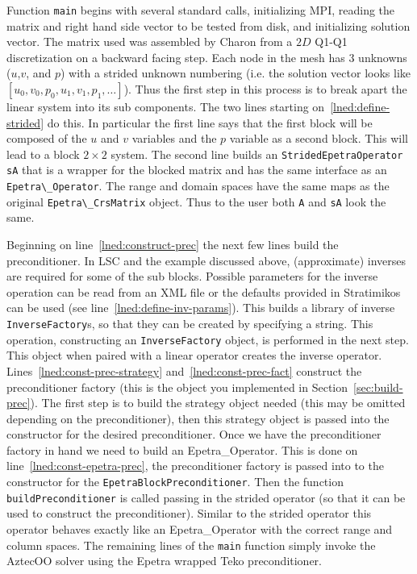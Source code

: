 \documentclass[12pt]{article}
\newcommand{\code}[1]{\lstinline[basicstyle=\footnotesize]!#1!}
\begin{document}
Function \code{main} begins with several standard calls, initializing MPI, 
reading the matrix and right hand side vector to be tested from disk, and initializing solution
vector. The matrix used was assembled by Charon from a $2D$ Q1-Q1 discretization on a 
backward facing step. Each node in the mesh has $3$ unknowns ($u$,$v$, and $p$)
with a strided unknown numbering (i.e. the solution vector looks like
$[u_0,v_0,p_0,u_1,v_1,p_1,\ldots]$). Thus the first step in this process is
to break apart the linear system into its sub components.  The two lines starting
on~\ref{lned:define-strided} do this. In particular the first line says
that the first block will be composed of the $u$ and $v$ variables
and the $p$ variable as a second block. This will lead to a block $2\times 2$
system. The second line builds an \code{StridedEpetraOperator} \code{sA} that is a wrapper for
the blocked matrix and has the same interface as an \code{Epetra\_Operator}. The range and
domain spaces have the same maps as the original \code{Epetra\_CrsMatrix} object. Thus to the user both
\code{A} and \code{sA} look the same.

Beginning on line~\ref{lned:construct-prec} the next few lines build the preconditioner.
In LSC and the example discussed above, (approximate) inverses are required for some of the
sub blocks.  Possible parameters for the inverse operation can be read from an XML
file or the defaults provided in Stratimikos can be used (see line~\ref{lned:define-inv-params}). 
This builds a library of inverse \code{InverseFactory}s, so that they can be created
by specifying a string. This operation, constructing an \code{InverseFactory} object, 
is performed in the next step.
This object when paired with a linear operator creates
the inverse operator. Lines~\ref{lned:const-prec-strategy} and~\ref{lned:const-prec-fact}
construct the preconditioner factory (this is the object you implemented in Section~\ref{sec:build-prec}).
The first step is to build the strategy object needed (this may be omitted depending on
the preconditioner), then this strategy object is passed into the constructor for the
desired preconditioner. Once we have the preconditioner factory in hand we need to
build an Epetra\_Operator. This is done on line~\ref{lned:const-epetra-prec}, the preconditioner
factory is passed into to the constructor for the \code{EpetraBlockPreconditioner}. Then
the function \code{buildPreconditioner} is called passing in the strided operator (so that
it can be used to construct the preconditioner). Similar to the strided operator this operator
behaves exactly like an Epetra\_Operator with the correct range and column spaces.
The remaining lines of the \code{main} function simply invoke the AztecOO solver using
the Epetra wrapped Teko preconditioner.
\end{document}
